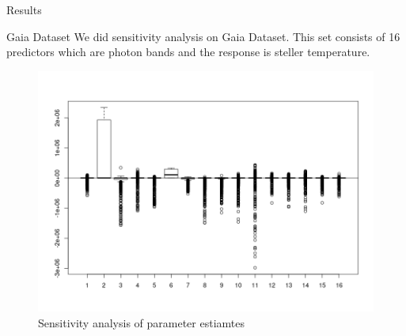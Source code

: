 \documentclass[tikz]{beamer}					%
\begin{document}
{
\begin{frame}{Results}
\begin{block}{Gaia Dataset}
    We did sensitivity analysis on Gaia Dataset. This set consists of 16 predictors
    which are photon bands and the response is steller temperature.
\end{block}
\begin{figure}
    \centering
    \includegraphics[width = 0.65\linewidth]{figures/sensty_gaia.png}
    \caption{Sensitivity analysis of parameter estiamtes}
\end{figure}
\end{frame}
}
\end{document}
